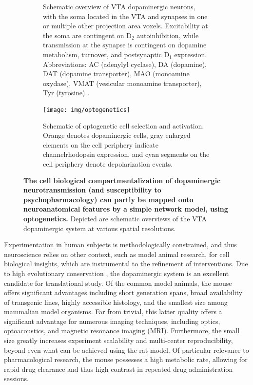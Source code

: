 \begin{sansmath}
\begin{figure}[h!]
\begin{subfigure}{.985\textwidth}
		\caption{
			Schematic overview of VTA dopaminergic neurons, with the soma located in the VTA and synapses in one or multiple other projection area voxels.
			Excitability at the soma are contingent on $\mathrm{D_2}$ autoinhibition, while transmission at the synapse is contingent on dopamine metabolism, turnover, and postsynaptic $\mathrm{D_1}$ expression.
			Abbreviations: AC (adenylyl cyclase), DA (dopamine), DAT (dopamine transporter), MAO (monoamine oxydase), VMAT (vesicular monoamine transporter), Tyr (tyrosine) \cite{Torres2003}.
			}
		\label{fig:cm}
	\end{subfigure}
	\begin{subfigure}{.985\textwidth}
		\centering
		\vspace{.5em}
		\texttt{[image: img/optogenetics]}
		\caption{
			Schematic of optogenetic cell selection and activation.
			Orange denotes dopaminergic cells, gray enlarged elements on the cell periphery indicate channelrhodopsin expression, and cyan segments on the cell periphery denote depolarization events.
			}
		\label{fig:og}
	\end{subfigure}
	\caption{
		\textbf{The cell biological compartmentalization of dopaminergic neurotransmission (and susceptibility to psychopharmacology) can partly be mapped onto neuroanatomical features by a simple network model, using optogenetics.}
		Depicted are schematic overviews of the VTA dopaminergic system at various spatial resolutions.
		}
	\label{fig:m}
\end{figure}
\end{sansmath}

Experimentation in human subjects is methodologically constrained, and thus neuroscience relies on other context, such as model animal research, for cell biological insights, which are instrumental to the refinement of interventions.
Due to high evolutionary conservation \cite{Yamamoto2011}, the dopaminergic system is an excellent candidate for translational study.
Of the common model animals, the mouse offers significant advantages including short generation spans, broad availability of transgenic lines, highly accessible histology, and the smallest size among mammalian model organisms.
Far from trivial, this latter quality offers a significant advantage for numerous imaging techniques, including optics, optoacoustics, and magnetic resonance imaging (MRI).
Furthermore, the small size greatly increases experiment scalability and multi-center reproducibility, beyond even what can be achieved using the rat model.
Of particular relevance to pharmacological research, the mouse possesses a high metabolic rate, allowing for rapid drug clearance and thus high contrast in repeated drug administration sessions.

